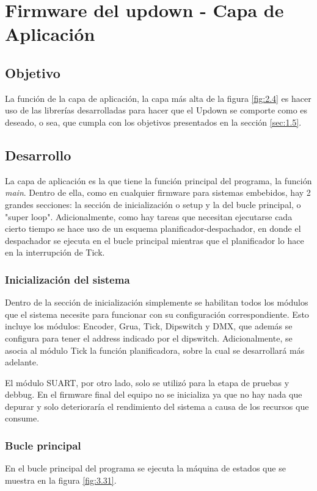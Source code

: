 \section{Firmware del updown - Capa de Aplicación} \label{sec:\thesection}

\subsection{Objetivo}
La función de la capa de aplicación, la capa más alta de la figura \ref{fig:2.4} es hacer uso de las librerías desarrolladas para hacer que el Updown se comporte como es deseado, o sea, que cumpla con los objetivos presentados en la sección \ref{sec:1.5}.

\subsection{Desarrollo}
La capa de aplicación es la que tiene la función principal del programa, la función \textit{main}. Dentro de ella, como en cualquier firmware para sistemas embebidos, hay 2 grandes secciones: la sección de inicialización o setup y la del bucle principal, o "super loop". Adicionalmente, como hay tareas que necesitan ejecutarse cada cierto tiempo se hace uso de un esquema planificador-despachador, en donde el despachador se ejecuta en el bucle principal mientras que el planificador lo hace en la interrupción de Tick.

\subsubsection{Inicialización del sistema}

Dentro de la sección de inicialización simplemente se habilitan todos los módulos que el sistema necesite para funcionar con su configuración correspondiente. Esto incluye los módulos: Encoder, Grua, Tick, Dipswitch y DMX, que además se configura para tener el address indicado por el dipswitch. Adicionalmente, se asocia al módulo Tick la función planificadora, sobre la cual se desarrollará más adelante.

El módulo SUART, por otro lado, solo se utilizó para la etapa de pruebas y debbug. En el firmware final del equipo no se inicializa ya que no hay nada que depurar y solo deterioraría el rendimiento del sistema a causa de los recursos que consume. 

\subsubsection{Bucle principal}
En el bucle principal del programa se ejecuta la máquina de estados que se muestra en la figura \ref{fig:3.31}. 

